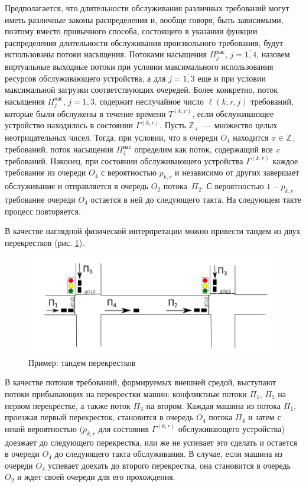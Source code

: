Предполагается,  что длительности обслуживания различных требований могут  иметь различные законы распределения и, вообще говоря,  быть зависимыми,  поэтому вместо привычного способа,  состоящего в указании функции распределения длительности обслуживания произвольного требования,  будут использованы потоки насыщения. Потоками насыщения $\Pi^{\mathrm{\text{нас}}}_j$,  $j=\overline{1, 4}$,  назовем виртуальные выходные потоки при условии максимального использования ресурсов обслуживающего устройства,  а для $j=\overline{1, 3}$ еще и при условии максимальной загрузки соответствующих очередей.
Более конкретно,  поток насыщения $\Pi^{\mathrm{\text{нас}}}_j$,  $j=\overline{1, 3}$,  содержит неслучайное число $\ell(k, r, j)$ требований,  которые были обслужены в течение времени $T^{(k, r)}$,  если обслуживающее устройство находилось в состоянии $\Gamma^{(k, r)}$. Пусть $\mathbb{Z}_+$~--- множество целых неотрицательных чисел. Тогда,  при условии,  что в очереди $O_4$ находится $x \in \mathbb{Z}_+$ требований,  поток насыщения $\Pi^{\mathrm{\text{нас}}}_4$ определим как поток,  содержащий все $x$ требований.
Наконец,  при состоянии обслуживающего устройства $\Gamma^{(k, r)}$ каждое требование из очереди $O_4$ с вероятностью $p_{k, r}$ и независимо от других завершает обслуживание и отправляется в очередь $O_2$ потока~$\Pi_2$. С вероятностью $1-p_{k, r}$ требование очереди $O_4$ остается в ней до следующего такта. На следующем такте процесс повторяется.

В качестве наглядной физической интерпретации можно привести тандем из двух перекрестков (рис. \ref{crossroads}).
\begin{figure}[h]\centering
\includegraphics[scale=0.5]{Pictures/Crossroads.png} 
\caption{Пример: тандем перекрестков}
\label{crossroads}
\end{figure}
В качестве потоков требований,  формируемых внешней средой,  выступают потоки прибывающих на перекрестки машин: конфликтные потоки $\Pi_1$,  $\Pi_5$ на первом перекрестке,  а также поток $\Pi_3$ на втором. Каждая машина из потока $\Pi_1$,  проезжая первый перекресток,  становится в очередь $O_4$ потока $\Pi_4$ и затем с некой вероятностью ($p_{k, r}$ для состояния $\Gamma^{(k, r)}$ обслуживающего устройства) доезжает до следующего перекрестка,  или же не успевает это сделать и остается в очереди $O_4$ до следующего такта обслуживания. В случае,  если машина из очереди $O_4$ успевает доехать до второго перекрестка,  она становится в очередь $O_2$ и ждет своей очереди для его прохождения.

